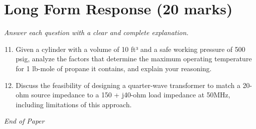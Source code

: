 \documentclass[12pt]{article}
\begin{document}
\section*{Long Form Response (20 marks)}
\textit{Answer each question with a clear and complete explanation.}
\begin{enumerate}[label=\arabic*.]
\setcounter{enumi}{10}
\item Given a cylinder with a volume of 10 ft³ and a safe working pressure of 500 psig, analyze
the factors that determine the maximum operating temperature for 1 lb-mole of propane it
contains, and explain your reasoning.
\item Discuss the feasibility of designing a quarter-wave transformer to match a 20-ohm source
impedance to a 150 + j40-ohm load impedance at 50MHz, including limitations of this
approach.
\end{enumerate}

\vfill
\noindent\textit{End of Paper}
\end{document}
